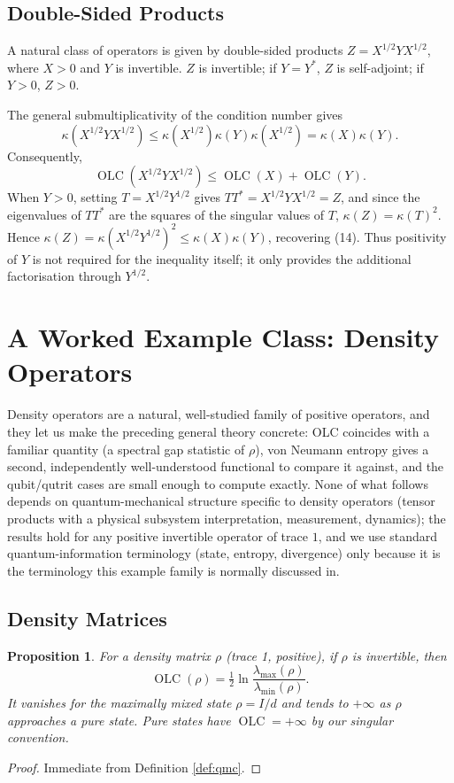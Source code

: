 \documentclass{article}
\newtheorem{proposition}[theorem]{Proposition}
\theoremstyle{remark}
\providecommand{\QLC}{\operatorname{OLC}}
\begin{document}
\subsection{Double-Sided Products}
A natural class of operators is given by double-sided products $Z=X^{1/2}YX^{1/2}$, where $X>0$ and $Y$ is invertible. $Z$ is invertible; if $Y=Y^*$, $Z$ is self-adjoint; if $Y>0$, $Z>0$.

The general submultiplicativity of the condition number gives
\[
\kappa(X^{1/2}YX^{1/2}) \le \kappa(X^{1/2})\kappa(Y)\kappa(X^{1/2}) = \kappa(X)\kappa(Y).
\]
Consequently,
\[
\QLC(X^{1/2}YX^{1/2}) \le \QLC(X)+\QLC(Y). \tag{14}
\]
When $Y>0$, setting $T=X^{1/2}Y^{1/2}$ gives $TT^*=X^{1/2}YX^{1/2}=Z$, and since the eigenvalues of $TT^*$ are the squares of the singular values of $T$, $\kappa(Z)=\kappa(T)^2$. Hence $\kappa(Z)=\kappa(X^{1/2}Y^{1/2})^2\le\kappa(X)\kappa(Y)$, recovering (14). Thus positivity of $Y$ is not required for the inequality itself; it only provides the additional factorisation through $Y^{1/2}$.


\section{A Worked Example Class: Density Operators}\label{sec:applications}

Density operators are a natural, well-studied family of positive operators, and they let us make the preceding general theory concrete: OLC coincides with a familiar quantity (a spectral gap statistic of $\rho$), von Neumann entropy gives a second, independently well-understood functional to compare it against, and the qubit/qutrit cases are small enough to compute exactly. None of what follows depends on quantum-mechanical structure specific to density operators (tensor products with a physical subsystem interpretation, measurement, dynamics); the results hold for any positive invertible operator of trace $1$, and we use standard quantum-information terminology (state, entropy, divergence) only because it is the terminology this example family is normally discussed in.

\subsection{Density Matrices}

\begin{proposition}
For a density matrix $\rho$ (trace 1, positive), if $\rho$ is invertible, then
\[
\QLC(\rho) = \tfrac12\ln\frac{\lambda_{\max}(\rho)}{\lambda_{\min}(\rho)}.
\]
It vanishes for the maximally mixed state $\rho=I/d$ and tends to $+\infty$ as $\rho$ approaches a pure state. Pure states have $\QLC=+\infty$ by our singular convention.
\end{proposition}
\begin{proof}
Immediate from Definition \ref{def:qmc}.
\end{proof}
\end{document}
